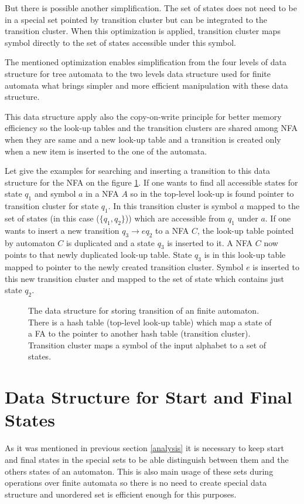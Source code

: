 But there is possible another simplification. The set of states does not need to be in a special set pointed by transition cluster but can be integrated
to the transition cluster. When this optimization is applied, transition cluster maps symbol directly to the set of states accessible under this symbol.

The mentioned optimization enables simplification from the four levels of data structure for tree automata to the two levels data structure used for finite
automata what brings simpler and more efficient manipulation with these data structure.

This data structure apply also the copy-on-write principle for better memory efficiency so the look-up tables and 
the transition clusters are shared among NFA when they are same and
a new look-up table and a transition is created only when a new item is inserted to the one of the automata.

Let give the examples for searching and inserting a transition to this data structure for the NFA on the figure \ref{figExplicitFADataStr}. 
If one wants to find all accessible states for state $q_1$ and symbol $a$ in a NFA $A$
so in the top-level look-up is found pointer to transition cluster for state $q_1$. In this
transition cluster is symbol $a$ mapped to the set of states (in this case ($\{q_1,q_2\}$)) which are accessible from $q_1$ under $a$.
If one wants to insert a new transition $q_3\rightarrow{e}q_2$ to a NFA $C$, the look-up table pointed by automaton $C$ is duplicated 
and a state $q_3$ is inserted to it. A NFA $C$ now points to that newly duplicated look-up table. State $q_3$ is in this look-up table 
mapped to pointer to the newly created transition cluster. 
Symbol $e$ is inserted to this new transition cluster and mapped to the set of state which contains just state $q_2$.

\begin{figure}[bt]
\begin{center}

		\label{figExplicitFADataStr}
    \caption{The data structure for storing transition of an finite automaton. There is a hash table (top-level look-up table) 
      which map a state of a FA to the pointer to another hash table (transition cluster). Transition cluster maps a symbol of the input alphabet
      to a set of states.}
\end{center}
\end{figure}

\section{Data Structure for Start and Final States}
As it was mentioned in previous section \ref{analysis} it is necessary to keep start and final states in the special sets to 
be able distinguish between them and the others states of an automaton. This is also main usage of these sets during operations 
over finite automata so there is no need to create special data structure and unordered set is efficient enough for this purposes.

